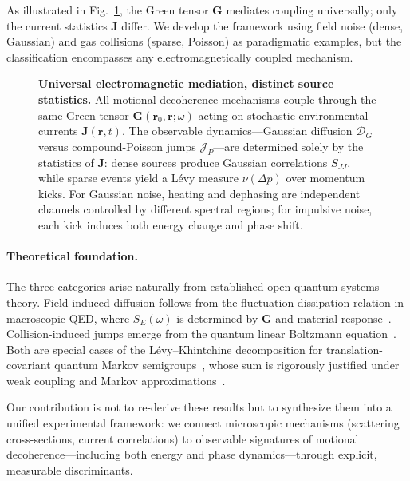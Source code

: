 As illustrated in Fig.~\ref{fig:em_mediation}, the Green tensor $\mathbf{G}$ mediates coupling universally; only the current statistics $\mathbf{J}$ differ. We develop the framework using field noise (dense, Gaussian) and gas collisions (sparse, Poisson) as paradigmatic examples, but the classification encompasses any electromagnetically coupled mechanism.

\begin{figure}[t]
  \centering
  
  \caption{\textbf{Universal electromagnetic mediation, distinct source statistics.}
  All motional decoherence mechanisms couple through the same Green tensor $\mathbf{G}(\mathbf{r}_0,\mathbf{r};\omega)$ acting on stochastic environmental currents $\mathbf{J}(\mathbf{r},t)$. 
  The observable dynamics—Gaussian diffusion $\mathcal{D}_G$ versus compound-Poisson jumps $\mathcal{J}_P$—are determined solely by the statistics of $\mathbf{J}$: dense sources produce Gaussian correlations $S_{JJ}$, while sparse events yield a L\'evy measure $\nu(\Delta p)$ over momentum kicks. For Gaussian noise, heating and dephasing are independent channels controlled by different spectral regions; for impulsive noise, each kick induces both energy change and phase shift.}
  \label{fig:em_mediation}
\end{figure}

\paragraph{Theoretical foundation.}
The three categories arise naturally from established open-quantum-systems theory. Field-induced diffusion follows from the fluctuation-dissipation relation in macroscopic QED, where $S_E(\omega)$ is determined by $\mathbf{G}$ and material response~\cite{ScheelBuhmann2008,Brownnutt2015,BuhmannDispersionForcesII}. Collision-induced jumps emerge from the quantum linear Boltzmann equation~\cite{HornbergerSipe2003,VacchiniHornberger2009,OghittuNJPhys2023}. Both are special cases of the L\'evy--Khintchine decomposition for translation-covariant quantum Markov semigroups~\cite{Holevo1993,VacchiniJMathPhys2001}, whose sum is rigorously justified under weak coupling and Markov approximations~\cite{BreuerPetruccione2002}. 

Our contribution is not to re-derive these results but to synthesize them into a unified experimental framework: we connect microscopic mechanisms (scattering cross-sections, current correlations) to observable signatures of motional decoherence—including both energy and phase dynamics—through explicit, measurable discriminants.

